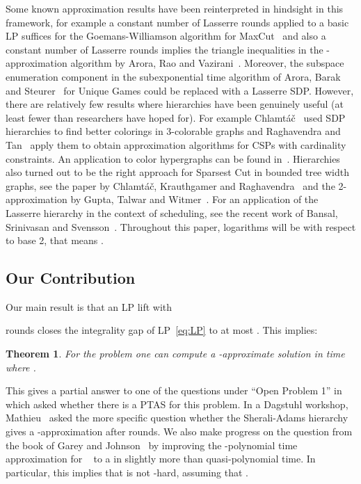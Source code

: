 \documentclass[11pt,letterpaper,oneside,english]{article}
\theoremstyle{theorem}
\newtheorem{theorem}{Theorem}
\begin{document}
Some known approximation results have been reinterpreted in hindsight in this framework, for 
example a constant number of Lasserre rounds applied to a basic LP suffices for the 
Goemans-Williamson algorithm for MaxCut~\cite{MaxCut-GoemansWilliamson-JACM95} and also a constant 
number of Lasserre rounds
implies the triangle inequalities in the -approximation algorithm by 
Arora, Rao and Vazirani~\cite{SparsestCut-AroraRaoVazirani-JACM09}. Moreover, the
subspace enumeration component in the subexponential time algorithm of Arora, Barak and
Steurer~\cite{UniqueGamesAlgo-AroraBarakSteurer-FOCS10} for Unique Games could be replaced with a Lasserre SDP.
However, there are relatively few results where hierarchies
have been genuinely useful (at least fewer than researchers have hoped for). 
For example Chlamt{\'a}{\v c}~\cite{ApproxAlgoViaSDP-Chlamtac-FOCS07}
used SDP hierarchies to find better colorings in 3-colorable graphs and Raghavendra and 
Tan~\cite{CSPs-with-card-constraints-RaghavendraTanSODA12} apply them to obtain approximation
algorithms for CSPs with cardinality constraints. An application to color
hypergraphs can be found in~\cite{HypergraphColoringChlamtacSinghAPPROX08}.
Hierarchies also turned out to be the
right approach for Sparsest Cut in bounded tree width graphs, see the paper by 
Chlamt{\'a}{\v c}, Krauthgamer and Raghavendra~\cite{SparsestCutInBoundedTreeWidthGraphs-CKR-APPROX2010} 
and the 2-approximation by Gupta, Talwar and Witmer~\cite{SparsestCut-GuptaTalwarWitmer-STOC2013}.
For an application of the Lasserre hierarchy in the context of scheduling, see the recent work 
of Bansal, Srinivasan and Svensson~\cite{LiftAndRound-BansalSrinivasanSvensson-STOC2016}.
Throughout this paper, logarithms will be with respect to base 2, that means .







\subsection{Our Contribution}

Our main result is that an LP lift with 

rounds closes the integrality gap of LP~\eqref{eq:LP} to at most . This implies:
\begin{theorem}
For the problem  one can compute a -approximate
solution in time  where . \end{theorem}
This gives a partial answer to one of the questions under ``Open Problem 1'' in \cite{TenOpenProblems-SchuurmanWoeginger1991}
which asked whether there is a PTAS for this problem. 
In a Dagstuhl workshop, Mathieu~\cite{DagstuhlOpenProblems2010} asked the more specific 
question whether the Sherali-Adams hierarchy gives a -approximation 
after  rounds. We also make progress on the question from the book of Garey and 
Johnson~\cite{GareyJohnson79}
by improving the -polynomial time approximation for ~\cite{TwoSchedulingAlgorithms-Lam-Sethi-SICOMP77}
to a  in slightly more than quasi-polynomial time. In particular, this implies that    is
not -hard, assuming that .
\end{document}
